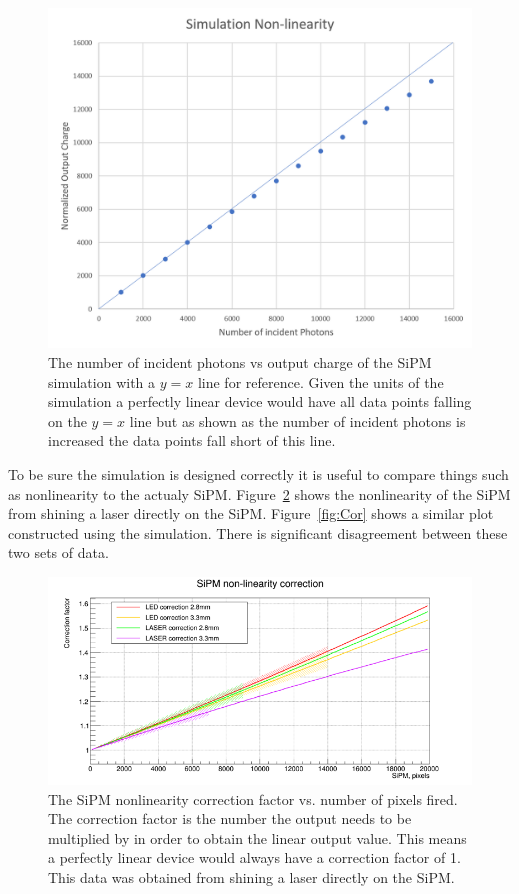 \begin{figure}
\centering
\includegraphics[width=0.8\linewidth]{Figures/SimNon.png}
\caption{The number of incident photons vs output charge of the SiPM simulation with a $y=x$ line for reference. Given the units of the simulation a perfectly linear device would have all data points falling on the $y=x$ line but as shown as the number of incident photons is increased the data points fall short of this line.}
\label{fig:SimNon}
\end{figure}

To be sure the simulation is designed correctly it is useful to compare things such as nonlinearity to the actualy SiPM. Figure~\ref{fig:NonLin} shows the nonlinearity of the SiPM from shining a laser directly on the SiPM. Figure~\ref{fig:Cor} shows a similar plot constructed using the simulation. There is significant disagreement between these two sets of data.

\begin{figure}
\centering
\includegraphics[width=\linewidth]{Figures/LaserNonLin.png}
\caption{The SiPM nonlinearity correction factor vs. number of pixels fired. The correction factor is the number the output needs to be multiplied by in order to obtain the linear output value. This means a perfectly linear device would always have a correction factor of 1. This data was obtained from shining a laser directly on the SiPM.}
\label{fig:NonLin}
\end{figure}

